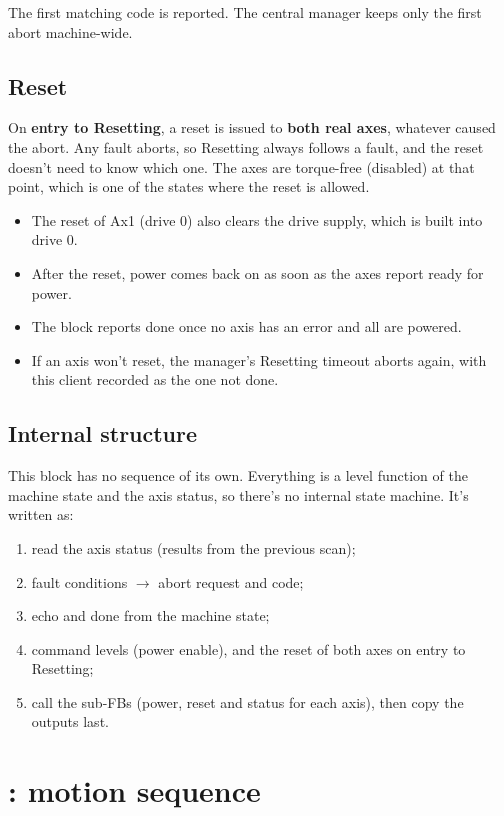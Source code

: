 \documentclass[11pt,a4paper]{report}
\DeclareRobustCommand{\code}[1]{\texttt{\detokenize{#1}}}
\begin{document}
The first matching code is reported. The central manager keeps only the first abort
machine-wide.

\subsection{Reset}

On \textbf{entry to Resetting}, a reset is issued to \textbf{both real axes}, whatever caused
the abort. Any fault aborts, so Resetting always follows a fault, and the reset doesn't need to
know which one. The axes are torque-free (disabled) at that point, which is one of the states
where the reset is allowed.
\begin{itemize}
  \item The reset of Ax1 (drive 0) also clears the drive supply, which is built into drive 0.
  \item After the reset, power comes back on as soon as the axes report ready for power.
  \item The block reports done once no axis has an error and all are powered.
  \item If an axis won't reset, the manager's Resetting timeout aborts again, with this client
        recorded as the one not done.
\end{itemize}

\subsection{Internal structure}

This block has no sequence of its own. Everything is a level function of the machine state and
the axis status, so there's no internal state machine. It's written as:
\begin{enumerate}
  \item read the axis status (results from the previous scan);
  \item fault conditions $\rightarrow$ abort request and code;
  \item echo and done from the machine state;
  \item command levels (power enable), and the reset of both axes on entry to Resetting;
  \item call the sub-FBs (power, reset and status for each axis), then copy the outputs last.
\end{enumerate}

\section{\texorpdfstring{\code{FB_ServoMotionSeq}}{FB_ServoMotionSeq}: motion sequence}
\end{document}
